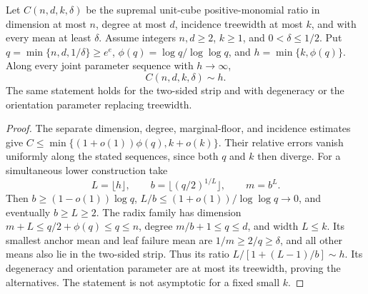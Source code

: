 \begin{theorem}\label{thm:joint-growth}
Let $C(n,d,k,\delta)$ be the supremal unit-cube positive-monomial ratio
in dimension at most $n$, degree at most $d$, incidence treewidth at most
$k$, and with every mean at least $\delta$. Assume integers $n,d\ge2$,
$k\ge1$, and $0<\delta\le1/2$. Put
$q=\min\{n,d,1/\delta\}\ge e^e$,
$\phi(q)=\log q/\log\log q$, and $h=\min\{k,\phi(q)\}$.
Along every joint parameter sequence with $h\to\infty$,
\[
 C(n,d,k,\delta)\sim h.
\]
The same statement holds for the two-sided strip and with degeneracy or
the orientation parameter replacing treewidth.
\end{theorem}
\begin{proof}
The separate dimension, degree, marginal-floor, and incidence estimates
give $C\le\min\{(1+o(1))\phi(q),k+o(k)\}$. Their relative errors vanish
uniformly along the stated sequences, since both $q$ and $k$ then diverge.
For a simultaneous lower construction take
\[
 L=\lfloor h\rfloor,\qquad b=\lfloor(q/2)^{1/L}\rfloor,\qquad m=b^L.
\]
Then $b\ge(1-o(1))\log q$, $L/b\le(1+o(1))/\log\log q\to0$,
and eventually $b\ge L\ge2$. The radix family has dimension
$m+L\le q/2+\phi(q)\le q\le n$, degree $m/b+1\le q\le d$, and
width $L\le k$. Its smallest anchor mean and leaf failure mean are
$1/m\ge2/q\ge\delta$, and all other means also lie in the two-sided
strip. Thus its ratio $L/[1+(L-1)/b]\sim h$. Its degeneracy and
orientation parameter are at most its treewidth, proving the alternatives.
The statement is not asymptotic for a fixed small $k$.
\end{proof}
